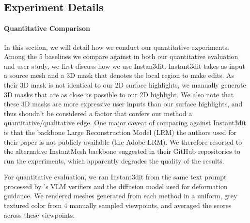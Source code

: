 \subsection{Experiment Details}
\label{subsec:experiment_details}
\paragraph{Quantitative Comparison} In this section, we will detail how we conduct our quantitative experiments. Among the 5 baselines we compare against in both our quantitative evaluation and user study, we first discuss how we use Instan3dit. Instant3dit takes as input a source mesh and a 3D mask that denotes the local region to make edits. As their 3D mask is not identical to our 2D surface highlights, we manually generate 3D masks that are as close as possible to our 2D highlight. We also note that these 3D masks are more expressive user inputs than our surface highlights, and thus shoudn't be considered a factor that confers our method a quantitative/qualitative edge. One major caveat of comparing against Instant3dit is that the backbone Large Reconstruction Model (LRM) the authors used for their paper is not publicly available (the Adobe LRM). We therefore resorted to the alternative InstantMesh \cite{xu2024instantmeshefficient3dmesh} backbone suggested in their GitHub repositories to run the experiments, which apparently degrades the quality of the results. 

For quantitative evaluation, we ran Instant3dit from the same text prompt processed by \ourmethod{}'s VLM verifiers and the diffusion model used for deformation guidance. We rendered meshes generated from each method in a uniform, grey textured color from 4 manually sampled viewpoints, and averaged the scores across these viewpoints.



